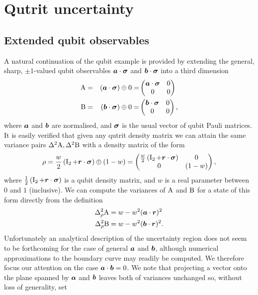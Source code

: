 \section{Qutrit uncertainty}
\label{sec:qutrit}
\subsection{Extended qubit observables}
\label{sec:qubit-extended-uncertainty}
A natural continuation of the qubit example is provided by extending the general, sharp, $\pm 1$-valued qubit observables $\bm{a}\cdot{\boldsymbol\sigma}$ and $\bm{b}\cdot{\boldsymbol\sigma}$ into a third dimension
\begin{alignat}{3}
  \label{eqn:extended-qubit-obs-defn}
  \operatorname{A} &= &(\bm{a}\cdot{\boldsymbol\sigma}) \oplus 0 = &\begin{pmatrix}\bm{a}\cdot{\boldsymbol\sigma} & 0\\ 0 &0\\\end{pmatrix}\\
  \operatorname{B} &= &(\bm{b}\cdot{\boldsymbol\sigma}) \oplus 0 = &\begin{pmatrix}\bm{b}\cdot{\boldsymbol\sigma} & 0\\ 0 &0\\\end{pmatrix},
\end{alignat}
where $\bm{a}$ and $\bm{b}$ are normalised, and ${\boldsymbol\sigma}$ is the usual vector of qubit Pauli matrices. It is easily verified that given any qutrit density matrix we can attain the same variance pairs $\var{\opa}, \var{\opb}$ with a density matrix of the form
\begin{align}
  \rho =\frac{w}{2}\left(\operatorname{I}_2 + \bm{r}\cdot{\boldsymbol\sigma}\right) \oplus (1-w)=\begin{pmatrix}\frac{w}{2}\left(\operatorname{I}_2 + \bm{r}\cdot{\boldsymbol\sigma}\right) & 0 \\ 0& (1-w)\end{pmatrix},
\end{align}
where $\frac{1}{2}\left(\operatorname{I}_2 + \bm{r}\cdot{\boldsymbol\sigma}\right)$ is a qubit density matrix, and $w$ is a real parameter between $0$ and $1$ (inclusive). We can compute the variances of $\operatorname{A}$ and $\operatorname{B}$ for a state of this form directly from the definition
\begin{align}
  \varr{\opa} &= w - w^2 (\boa\cdot\bor)^2\\
  \varr{\opb} &= w - w^2 (\bob\cdot\bor)^2.
\end{align}
Unfortunately an analytical description of the uncertainty region does not seem to be forthcoming for the case of general $\bm{a}$ and $\bm{b}$, although numerical approximations to the boundary curve may readily be computed. We therefore focus our attention on the case $\bm{a}\cdot\bm{b} = 0$. We note that projecting a vector onto the plane spanned by $\bm{a}$ and $\bm{b}$ leaves both of variances unchanged so, without loss of generality, set 
